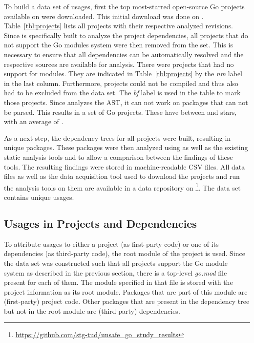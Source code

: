 To build a data set of \unsafe{} usages, first the top \projsTotal{} most-starred open-source Go projects available on
\github{} were downloaded.
This initial download was done on .
Table~\ref{tbl:projects} lists all projects with their respective analyzed revisions.
Since \toolGeiger{} is specifically built to analyze the project dependencies, all projects that do not support the Go
modules system were then removed from the set.
This is necessary to ensure that all dependencies can be automatically resolved and the respective sources are available
for analysis.
There were \projsWithoutModules{} projects that had no support for modules.
They are indicated in Table~\ref{tbl:projects} by the \textit{nm} label in the last column.
Furthermore, \projsNotCompiled{} projects could not be compiled and thus also had to be excluded from the data set.
The \textit{bf} label is used in the table to mark those projects.
Since \toolGeiger{} analyzes the \acrshort{AST}, it can not work on packages that can not be parsed.
This results in a set of \projsAnalyzed{} Go projects.
These have between  and  stars, with an average of .

As a next step, the dependency trees for all projects were built, resulting in \packagesAnalyzed{} unique packages.
These packages were then analyzed using \toolGeiger{} as well as the existing static analysis tools \toolVet{} and
\toolGosec{} to allow a comparison between the findings of these tools.
The resulting findings were stored in machine-readable \acrshort{CSV} files.
All data files as well as the data acquisition tool used to download the projects and run the analysis tools on them
are available in a data repository on \github{}\footnote{\url{https://github.com/stg-tud/unsafe_go_study_results}}.
The data set contains \uniqueUnsafeFindings{} unique \unsafe{} usages.



\subsection{Usages in Projects and Dependencies}\label{subsec:go-geiger:evaluation:unsafe-usage}

To attribute \unsafe{} usages to either a project (as first-party code) or one of its dependencies (as third-party
code), the root module of the project is used.
Since the data set was constructed such that all projects support the Go module system as described in the previous
section, there is a top-level \textit{go.mod} file present for each of them.
The module specified in that file is stored with the project information as its root module.
Packages that are part of this module are (first-party) project code.
Other packages that are present in the dependency tree but not in the root module are (third-party) dependencies.

